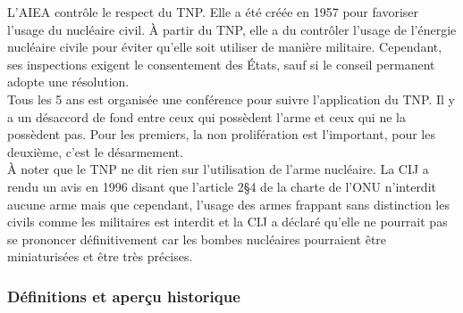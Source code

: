 \documentclass[10pt, a4paper, openany]{book}
\begin{document}
L'AIEA contrôle le respect du TNP. Elle a été créée en 1957 pour favoriser l'usage du nucléaire civil. À partir du TNP, elle a du contrôler l'usage de l'énergie nucléaire civile pour éviter qu'elle soit utiliser de manière militaire. Cependant, ses inspections exigent le consentement des États, sauf si le conseil permanent adopte une résolution. \\
Tous les 5 ans est organisée une conférence pour suivre l'application du TNP. Il y a un désaccord de fond entre ceux qui possèdent l'arme et ceux qui ne la possèdent pas. Pour les premiers, la non prolifération est l'important, pour les deuxième, c'est le désarmement. \\
À noter que le TNP ne dit rien sur l'utilisation de l'arme nucléaire. La CIJ a rendu un avis en 1996 disant que l'article 2§4 de la charte de l'ONU n'interdit aucune arme mais que cependant, l'usage des armes frappant sans distinction les civils comme les militaires est interdit et la CIJ a déclaré qu'elle ne pourrait pas se prononcer définitivement car les bombes nucléaires pourraient être miniaturisées et être très précises. 

\subsubsection{Définitions et aperçu historique}
\end{document}
